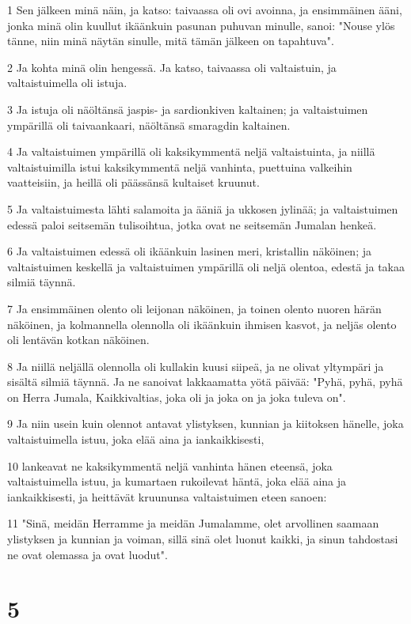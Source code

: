 \par 1 Sen jälkeen minä näin, ja katso: taivaassa oli ovi avoinna, ja ensimmäinen ääni, jonka minä olin kuullut ikäänkuin pasunan puhuvan minulle, sanoi: "Nouse ylös tänne, niin minä näytän sinulle, mitä tämän jälkeen on tapahtuva".
\par 2 Ja kohta minä olin hengessä. Ja katso, taivaassa oli valtaistuin, ja valtaistuimella oli istuja.
\par 3 Ja istuja oli näöltänsä jaspis- ja sardionkiven kaltainen; ja valtaistuimen ympärillä oli taivaankaari, näöltänsä smaragdin kaltainen.
\par 4 Ja valtaistuimen ympärillä oli kaksikymmentä neljä valtaistuinta, ja niillä valtaistuimilla istui kaksikymmentä neljä vanhinta, puettuina valkeihin vaatteisiin, ja heillä oli päässänsä kultaiset kruunut.
\par 5 Ja valtaistuimesta lähti salamoita ja ääniä ja ukkosen jylinää; ja valtaistuimen edessä paloi seitsemän tulisoihtua, jotka ovat ne seitsemän Jumalan henkeä.
\par 6 Ja valtaistuimen edessä oli ikäänkuin lasinen meri, kristallin näköinen; ja valtaistuimen keskellä ja valtaistuimen ympärillä oli neljä olentoa, edestä ja takaa silmiä täynnä.
\par 7 Ja ensimmäinen olento oli leijonan näköinen, ja toinen olento nuoren härän näköinen, ja kolmannella olennolla oli ikäänkuin ihmisen kasvot, ja neljäs olento oli lentävän kotkan näköinen.
\par 8 Ja niillä neljällä olennolla oli kullakin kuusi siipeä, ja ne olivat yltympäri ja sisältä silmiä täynnä. Ja ne sanoivat lakkaamatta yötä päivää: "Pyhä, pyhä, pyhä on Herra Jumala, Kaikkivaltias, joka oli ja joka on ja joka tuleva on".
\par 9 Ja niin usein kuin olennot antavat ylistyksen, kunnian ja kiitoksen hänelle, joka valtaistuimella istuu, joka elää aina ja iankaikkisesti,
\par 10 lankeavat ne kaksikymmentä neljä vanhinta hänen eteensä, joka valtaistuimella istuu, ja kumartaen rukoilevat häntä, joka elää aina ja iankaikkisesti, ja heittävät kruununsa valtaistuimen eteen sanoen:
\par 11 "Sinä, meidän Herramme ja meidän Jumalamme, olet arvollinen saamaan ylistyksen ja kunnian ja voiman, sillä sinä olet luonut kaikki, ja sinun tahdostasi ne ovat olemassa ja ovat luodut".

\chapter{5}

